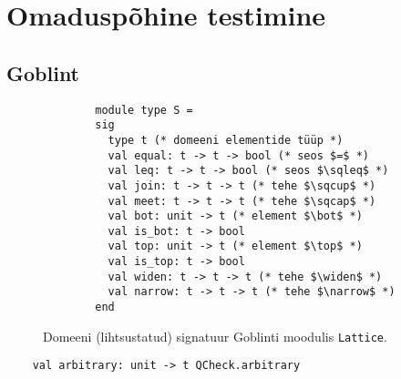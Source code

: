 \documentclass[../thesis.tex]{subfiles}
\begin{document}
\section{Omaduspõhine testimine}

\subsection{Goblint}

\begin{figure}
	\centering
	\begin{verbatim}
		module type S =
		sig
		  type t (* domeeni elementide tüüp *)
		  val equal: t -> t -> bool (* seos $=$ *)
		  val leq: t -> t -> bool (* seos $\sqleq$ *)
		  val join: t -> t -> t (* tehe $\sqcup$ *)
		  val meet: t -> t -> t (* tehe $\sqcap$ *)
		  val bot: unit -> t (* element $\bot$ *)
		  val is_bot: t -> bool
		  val top: unit -> t (* element $\top$ *)
		  val is_top: t -> bool
		  val widen: t -> t -> t (* tehe $\widen$ *)
		  val narrow: t -> t -> t (* tehe $\narrow$ *)
		end
	\end{verbatim}
	\caption{Domeeni (lihtsustatud) signatuur Goblinti moodulis \texttt{Lattice}.}
	\label{fig:lattice-s}
\end{figure}

\begin{verbatim}
	val arbitrary: unit -> t QCheck.arbitrary
\end{verbatim}

\end{document}
